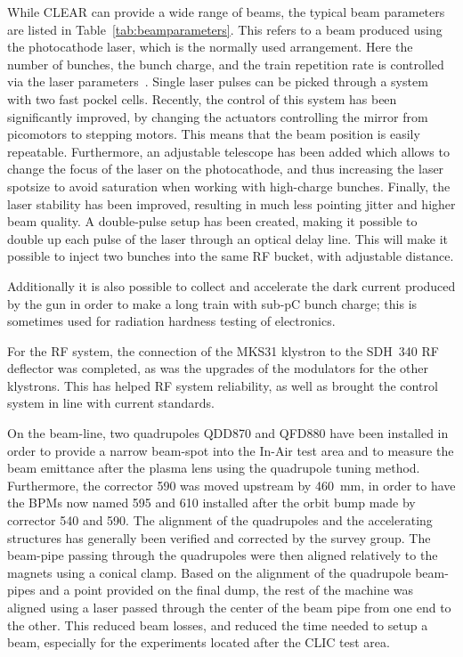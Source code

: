 \documentclass[a4paper,
               keeplastbox,   %
               ]{jacow}
\begin{document}
While CLEAR can provide a wide range of beams, the typical beam parameters are listed in Table~\ref{tab:beamparameters}.
This refers to a beam produced using the photocathode laser, which is the normally used arrangement.
Here the number of bunches, the bunch charge, and the train repetition rate is controlled via the laser parameters~\cite{LucaGun,BrossardGun}.
Single laser pulses can be picked through a system with two fast pockel cells.
Recently, the control of this system has been significantly improved, by changing the actuators controlling the mirror from picomotors to stepping motors.
This means that the beam position is easily repeatable.
Furthermore, an adjustable telescope has been added which allows to change the focus of the laser on the photocathode, and thus increasing the laser spotsize to avoid saturation when working with high-charge bunches.
Finally, the laser stability has been improved, resulting in much less pointing jitter and higher beam quality.
A double-pulse setup has been created, making it possible to double up each pulse of the laser through an optical delay line.
This will make it possible to inject two bunches into the same RF bucket, with adjustable distance.

Additionally it is also possible to collect and accelerate the dark current produced by the gun in order to make a long train with sub-pC bunch charge; this is sometimes used for radiation hardness testing of electronics.

For the RF system, the connection of the MKS31 klystron to the SDH~340 RF deflector was completed, as was the upgrades of the modulators for the other klystrons.
This has helped RF system reliability, as well as brought the control system in line with current standards.


On the beam-line, two quadrupoles QDD870 and QFD880 have been installed in order to provide a narrow beam-spot into the In-Air test area and to measure the beam emittance after the plasma lens using the quadrupole tuning method.
Furthermore, the corrector 590 was moved upstream by 460~mm, in order to have the BPMs now named 595 and 610 installed after the orbit bump made by corrector 540 and 590.
The alignment of the quadrupoles and the accelerating structures has generally been verified and corrected by the survey group.
The beam-pipe passing through the quadrupoles were then aligned relatively to the magnets using a conical clamp.
Based on the alignment of the quadrupole beam-pipes and a point provided on the final dump, the rest of the machine was aligned using a laser passed through the center of the beam pipe from one end to the other.
This reduced beam losses, and reduced the time needed to setup a beam, especially for the experiments located after the CLIC test area.
\end{document}
